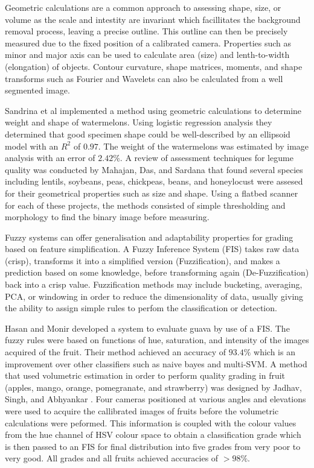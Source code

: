 \documentclass[fleqn,twoside]{article}
\begin{document}
Geometric calculations are a common approach to assessing shape, size, or volume as the scale and intestity are invariant which facillitates the background removal process, leaving a precise outline. This outline can then be precisely measured due to the fixed position of a calibrated camera. Properties such as minor and major axis can be used to calculate area (size) and lenth-to-width (elongation) of objects. Contour curvature, shape matrices, moments, and shape transforms such as Fourier and Wavelets can also be calculated from a well segmented image. 

Sandrina et al \cite{sandrina} implemented a method using geometric calculations to determine weight and shape of watermelons. Using logistic regression analysis they determined that good specimen shape could be well-described by an ellipsoid model with an $R^2$ of $0.97$. The weight of the watermelons was estimated by image analysis with an error of $2.42\%$. A review of assessment techniques for legume quality was conducted by Mahajan, Das, and Sardana \cite{mahajan} that found several species including lentils, soybeans, peas, chickpeas, beans, and honeylocust were assesed for their geometrical properties such as size and shape. Using a flatbed scanner for each of these projects, the methods consisted of simple thresholding and morphology to find the binary image before measuring. 


Fuzzy systems can offer generalisation and adaptability properties for grading based on feature simplification. A Fuzzy Inference System (FIS) takes raw data (crisp), transforms it into a simplified version (Fuzzification), and makes a prediction based on some knowledge, before transforming again (De-Fuzzification) back into a crisp value. Fuzzification methods may include bucketing, averaging, PCA, or windowing in order to reduce the dimensionality of data, usually giving the ability to assign simple rules to perfom the classification or detection.

Hasan and Monir \cite{hasan} developed a system to evaluate guava by use of a FIS. The fuzzy rules were based on functions of hue, saturation, and intensity of the images acquired of the fruit. Their method achieved an accuracy of $93.4\%$ which is an improvement over other classifiers such as naive bayes and multi-SVM. A method that used volumetric estimation in order to perform quality grading in fruit (apples, mango, orange, pomegranate, and strawberry) was designed by Jadhav, Singh, and Abhyankar \cite{jadhav}. Four cameras positioned at various angles and elevations were used to acquire the callibrated images of fruits before the volumetric calculations were peformed. This information is coupled with the colour values from the hue channel of HSV colour space to obtain a classification grade which is then passed to an FIS for final distribution into five grades from very poor to very good. All grades and all fruits achieved accuracies of $>98\%$. 
\end{document}
